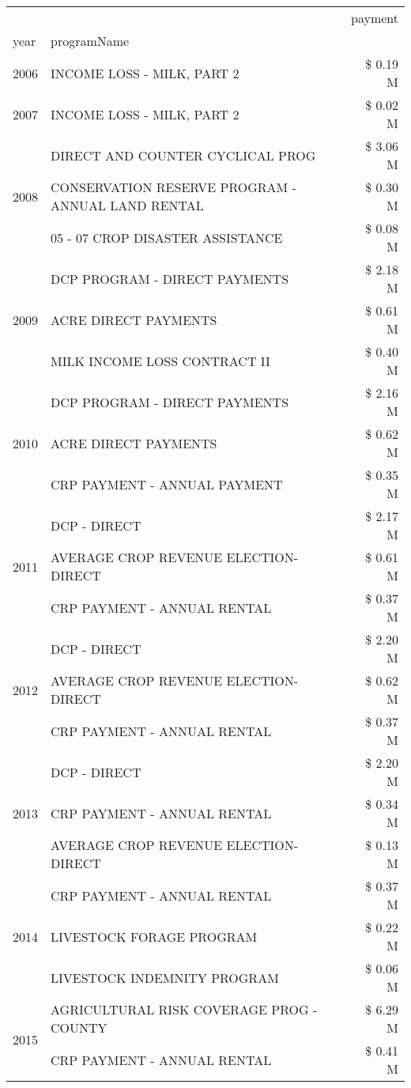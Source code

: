 \begin{tabular}{llr}
\toprule
 &  & payment \\
year & programName &  \\
\midrule
2006 & INCOME LOSS - MILK, PART 2 & \$ 0.19 M \\
\cline{1-3}
2007 & INCOME LOSS - MILK, PART 2 & \$ 0.02 M \\
\cline{1-3}
\multirow[t]{3}{*}{2008} & DIRECT AND COUNTER CYCLICAL PROG & \$ 3.06 M \\
 & CONSERVATION RESERVE PROGRAM - ANNUAL LAND RENTAL & \$ 0.30 M \\
 & 05 - 07 CROP DISASTER ASSISTANCE & \$ 0.08 M \\
\cline{1-3}
\multirow[t]{3}{*}{2009} & DCP PROGRAM - DIRECT PAYMENTS & \$ 2.18 M \\
 & ACRE DIRECT PAYMENTS & \$ 0.61 M \\
 & MILK INCOME LOSS CONTRACT II & \$ 0.40 M \\
\cline{1-3}
\multirow[t]{3}{*}{2010} & DCP PROGRAM - DIRECT PAYMENTS & \$ 2.16 M \\
 & ACRE DIRECT PAYMENTS & \$ 0.62 M \\
 & CRP PAYMENT - ANNUAL PAYMENT & \$ 0.35 M \\
\cline{1-3}
\multirow[t]{3}{*}{2011} & DCP - DIRECT & \$ 2.17 M \\
 & AVERAGE CROP REVENUE ELECTION-DIRECT & \$ 0.61 M \\
 & CRP PAYMENT - ANNUAL RENTAL & \$ 0.37 M \\
\cline{1-3}
\multirow[t]{3}{*}{2012} & DCP - DIRECT & \$ 2.20 M \\
 & AVERAGE CROP REVENUE ELECTION-DIRECT & \$ 0.62 M \\
 & CRP PAYMENT - ANNUAL RENTAL & \$ 0.37 M \\
\cline{1-3}
\multirow[t]{3}{*}{2013} & DCP - DIRECT & \$ 2.20 M \\
 & CRP PAYMENT - ANNUAL RENTAL & \$ 0.34 M \\
 & AVERAGE CROP REVENUE ELECTION-DIRECT & \$ 0.13 M \\
\cline{1-3}
\multirow[t]{3}{*}{2014} & CRP PAYMENT - ANNUAL RENTAL & \$ 0.37 M \\
 & LIVESTOCK FORAGE PROGRAM & \$ 0.22 M \\
 & LIVESTOCK INDEMNITY PROGRAM & \$ 0.06 M \\
\cline{1-3}
\multirow[t]{3}{*}{2015} & AGRICULTURAL RISK COVERAGE PROG - COUNTY & \$ 6.29 M \\
 & CRP PAYMENT - ANNUAL RENTAL & \$ 0.41 M \\

\end{tabular}
